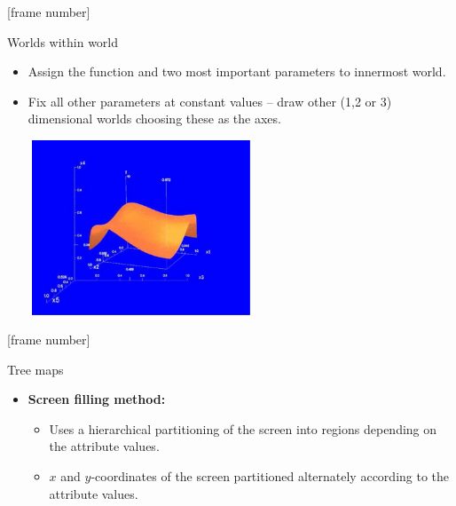 \documentclass[aspectratio=169,t]{beamer}
\begin{document}
  {
    [frame number]
    \begin{frame}{Worlds within world}
    \begin{itemize}
      \item Assign the function and two most important parameters to innermost world.
      \item Fix all other parameters at constant values -- draw other (1,2 or 3) dimensional worlds choosing these as the axes.
    \end{itemize}
    \centering
    \includegraphics[width=8cm,height=5.2cm]{img/www.jpg}
    \end{frame}
  }

  {
    [frame number]
    \begin{frame}{Tree maps}
    \centering
    \begin{itemize}
      \item \textbf{Screen filling method:}
      \begin{itemize}
        \item Uses a hierarchical partitioning of the screen into regions depending on the attribute values.
        \item $x$ and $y$-coordinates of the screen partitioned alternately according to the attribute values.
      \end{itemize}
    \end{itemize}
    \end{frame}
  }
\end{document}
